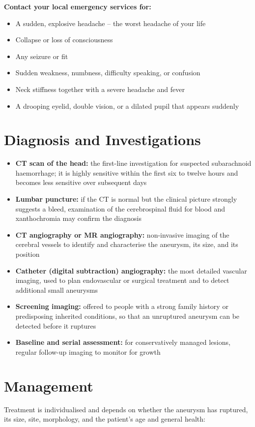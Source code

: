 \textbf{Contact your local emergency services for:}
\begin{itemize}
    \item A sudden, explosive headache -- the worst headache of your life
    \item Collapse or loss of consciousness
    \item Any seizure or fit
    \item Sudden weakness, numbness, difficulty speaking, or confusion
    \item Neck stiffness together with a severe headache and fever
    \item A drooping eyelid, double vision, or a dilated pupil that appears suddenly
\end{itemize}

\section*{Diagnosis and Investigations}
\begin{itemize}
    \item \textbf{CT scan of the head:} the first-line investigation for suspected subarachnoid haemorrhage; it is highly sensitive within the first six to twelve hours and becomes less sensitive over subsequent days
    \item \textbf{Lumbar puncture:} if the CT is normal but the clinical picture strongly suggests a bleed, examination of the cerebrospinal fluid for blood and xanthochromia may confirm the diagnosis
    \item \textbf{CT angiography or MR angiography:} non-invasive imaging of the cerebral vessels to identify and characterise the aneurysm, its size, and its position
    \item \textbf{Catheter (digital subtraction) angiography:} the most detailed vascular imaging, used to plan endovascular or surgical treatment and to detect additional small aneurysms
    \item \textbf{Screening imaging:} offered to people with a strong family history or predisposing inherited conditions, so that an unruptured aneurysm can be detected before it ruptures
    \item \textbf{Baseline and serial assessment:} for conservatively managed lesions, regular follow-up imaging to monitor for growth
\end{itemize}

\section*{Management}
Treatment is individualised and depends on whether the aneurysm has ruptured, its size, site, morphology, and the patient's age and general health:

